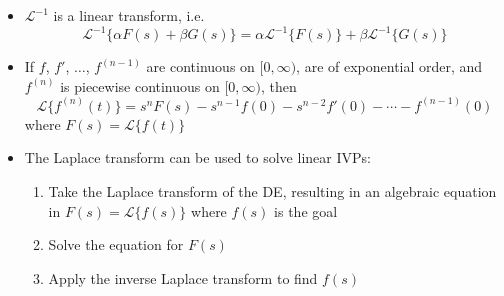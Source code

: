 \documentclass{article}
\begin{document}
\begin{itemize}
  \item $\mathcal{L}^{-1}$ is a linear transform, i.e. \[\mathcal{L}^{-1}\{\alpha F(s) + \beta G(s)\} = \alpha \mathcal{L}^{-1}\{F(s)\} + \beta \mathcal{L}^{-1}\{G(s)\}\]

  \item If $f$, $f'$, $\ldots$, $f^{(n - 1)}$ are continuous on $[0, \infty)$, are of exponential order, and $f^{(n)}$ is piecewise continuous on $[0, \infty)$, then \[\mathcal{L}\{f^{(n)}(t)\} = s^n F(s) - s^{n - 1} f(0) - s^{n - 2} f'(0) - \cdots - f^{(n - 1)}(0)\] where $F(s) = \mathcal{L}\{f(t)\}$

  \item The Laplace transform can be used to solve linear IVPs:

        \begin{enumerate}
          \item Take the Laplace transform of the DE, resulting in an algebraic equation in $F(s) = \mathcal{L}\{f(s)\}$ where $f(s)$ is the goal

          \item Solve the equation for $F(s)$

          \item Apply the inverse Laplace transform to find $f(s)$
        \end{enumerate}
\end{itemize}
\end{document}
